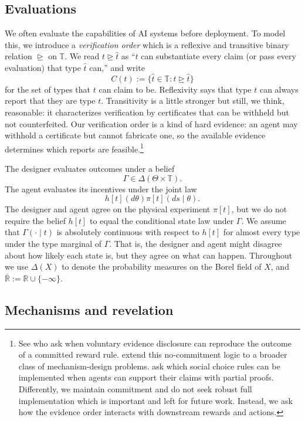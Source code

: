 \documentclass[12pt,reqno]{article}
\newcommand{\Rbar}{\overline{\mathbb{R}}}
\theoremstyle{definition} \newtheorem{example}{Example}
\theoremstyle{definition} \newtheorem{condition}{Condition}
\theoremstyle{definition} \newtheorem{corollary}{Corollary}
\theoremstyle{definition} \newtheorem{claim}{Claim}
\theoremstyle{definition} \newtheorem{definition}{Definition}
\theoremstyle{definition} \newtheorem{conjecture}{Conjecture}
\theoremstyle{definition} \newtheorem{Lemma}{Lemma}
\theoremstyle{definition} \newtheorem{lemma}{Lemma}
\theoremstyle{plain} \newtheorem{theorem}{Theorem}
\theoremstyle{definition} \newtheorem{assumption}{Assumption}
\theoremstyle{definition} \newtheorem*{assumptionnonumber}{Assumption}
\theoremstyle{definition} \newtheorem*{theoremNoNumber}{Proposition}
\theoremstyle{definition}\newtheorem{proposition}{Proposition}
\theoremstyle{definition} \newtheorem{observation}{Observation}
\theoremstyle{definition} \newtheorem*{definitionNoNumber}{Definition}
\theoremstyle{definition} \newtheorem{Definition}{Definition}
\theoremstyle{definition} \newtheorem*{DefinitionNoNumber}{Definition}
\theoremstyle{definition} \newtheorem*{fact}{Fact}
\theoremstyle{definition} \newtheorem*{property}{Property}
\theoremstyle{definition} \newtheorem{remark}{Remark}
\theoremstyle{definition}\newtheorem{romanexampleinner}{Example}
\begin{document}
\subsection{Evaluations} We often evaluate the capabilities of AI systems before deployment. To model this, we introduce a \emph{verification order} which is a reflexive and transitive binary relation $\trianglerighteq$ on $\mathbb T$. We read $t\trianglerighteq\hat t$ as ``$t$ can substantiate every claim (or pass every evaluation) that type $\hat t$ can,'' and write
\[
C(t):=\{\hat t\in\mathbb T: t\trianglerighteq\hat t\}
\]
for the set of types that $t$ can claim to be. Reflexivity says that type $t$ can always report that they are type $t$. Transitivity is a little stronger but still, we think, reasonable: it characterizes verification by certificates that can be withheld but not counterfeited. Our verification order is a kind of hard evidence: an agent may withhold a certificate but cannot fabricate one, so the available evidence determines which reports are feasible.\footnote{See  who ask when voluntary evidence disclosure can reproduce the outcome of a committed reward rule. \citet{benporath2019evidence} extend this no-commitment logic to a broader class of mechanism-design problems.  ask which social choice rules can be implemented when agents can support their claims with partial proofs. Differently, we maintain commitment and do not seek robust full implementation which is important and left for future work.  Instead, we ask how the evidence order interacts with downstream rewards and actions.} 

The designer evaluates outcomes under a belief
\[
\Gamma\in\Delta(\Theta\times\mathbb T).
\]
The agent evaluates its incentives under the joint law
\[
h[t](d\theta)\pi[t](ds\mid\theta).
\]
The designer and agent agree on the physical experiment \(\pi[t]\), but we do not require the belief \(h[t]\) to equal the conditional state law under \(\Gamma\). We assume that \(\Gamma(\cdot\mid t)\) is absolutely continuous with respect to \(h[t]\) for almost every type under the type marginal of \(\Gamma\). That is, the designer and agent might disagree about how likely each state is, but they agree on what can happen. Throughout we use \(\Delta(X)\) to denote the probability measures on the Borel field of \(X\), and \(\Rbar:=\mathbb R\cup\{-\infty\}\).

\subsection{Mechanisms and revelation}\label{sec:single-revelation}
\end{document}
